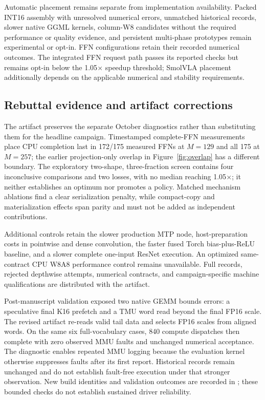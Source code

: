 \documentclass[sigplan,screen,review]{acmart}
\begin{document}
Automatic placement remains separate from implementation availability. Packed INT16 assembly with unresolved numerical errors, unmatched historical records, slower native GGML kernels, column-W8 candidates without the required performance or quality evidence, and persistent multi-phase prototypes remain experimental or opt-in. FFN configurations retain their recorded numerical outcomes. The integrated FFN request path passes its reported checks but remains opt-in below the 1.05$\times$ speedup threshold; SmolVLA placement additionally depends on the applicable numerical and stability requirements.


\subsection{Rebuttal evidence and artifact corrections}

The artifact preserves the separate October diagnostics rather than substituting them for the headline campaign. Timestamped complete-FFN measurements place CPU completion last in 172/175 measured FFNs at $M=129$ and all 175 at $M=257$; the earlier projection-only overlap in Figure~\ref{fig:overlap} has a different boundary. The exploratory two-shape, three-fraction screen contains four inconclusive comparisons and two losses, with no median reaching 1.05$\times$; it neither establishes an optimum nor promotes a policy. Matched mechanism ablations find a clear serialization penalty, while compact-copy and materialization effects span parity and must not be added as independent contributions.

Additional controls retain the slower production MTP node, host-preparation costs in pointwise and dense convolution, the faster fused Torch bias-plus-ReLU baseline, and a slower complete one-input ResNet execution. An optimized same-contract CPU W8A8 performance control remains unavailable. Full records, rejected depthwise attempts, numerical contracts, and campaign-specific machine qualifications are distributed with the artifact.

Post-manuscript validation exposed two native GEMM bounds errors: a speculative final K16 prefetch and a TMU word read beyond the final FP16 scale. The revised artifact re-reads valid tail data and selects FP16 scales from aligned words. On the same six full-vocabulary cases, 840 compute dispatches then complete with zero observed MMU faults and unchanged numerical acceptance. The diagnostic enables repeated MMU logging because the evaluation kernel otherwise suppresses faults after its first report. Historical records remain unchanged and do not establish fault-free execution under that stronger observation. New build identities and validation outcomes are recorded in ; these bounded checks do not establish sustained driver reliability.
\end{document}
